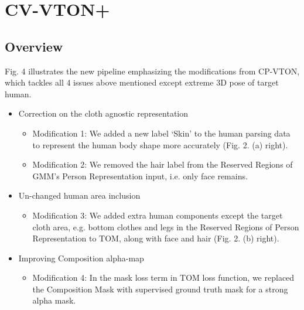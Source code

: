 

\section{CV-VTON+} \label{section:cpvton+}

\subsection{Overview} 

Fig. 4 illustrates the new pipeline emphasizing the modifications from CP-VTON, which tackles all 4 issues above mentioned except extreme 3D pose of target human.

\begin{itemize}

\item Correction on the cloth agnostic representation   


\begin{itemize}

\item Modification 1: We added a new label ‘Skin’ to the human parsing data to represent the human body shape more accurately (Fig. 2. (a) right).

\item Modification 2: We removed the hair label from the Reserved Regions of GMM’s Person Representation input, i.e. only face remains.  

\end{itemize}


\item Un-changed human area inclusion  

\begin{itemize}
\item Modification 3: We added extra human components except the target cloth area, e.g. bottom clothes and legs in the Reserved Regions of Person Representation to TOM, along with face and hair (Fig. 2. (b) right).

\end{itemize}

\item Improving Composition alpha-map 


\begin{itemize}

\item Modification 4: In the mask loss term in TOM loss function, we replaced the Composition Mask with supervised ground truth mask for a strong alpha mask.


\end{itemize}
\end{itemize}
